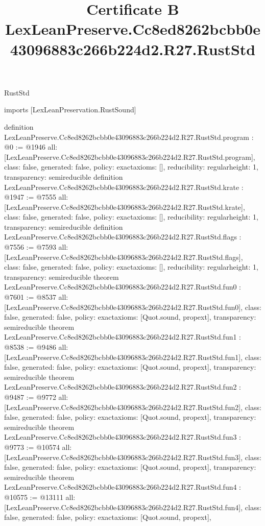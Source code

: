 \begin{lexlean}{RustStd}
\title{Certificate B LexLeanPreserve.Cc8ed8262bcbb0e43096883c266b224d2.R27.RustStd}
\begin{coremodule}
imports [LexLeanPreservation.RustSound]

definition LexLeanPreserve.Cc8ed8262bcbb0e43096883c266b224d2.R27.RustStd.program : @0 := @1946 {
  all: [LexLeanPreserve.Cc8ed8262bcbb0e43096883c266b224d2.R27.RustStd.program],
  class: false,
  generated: false,
  policy: exact{axioms: []},
  reducibility: regular{height: 1},
  transparency: semireducible
}
definition LexLeanPreserve.Cc8ed8262bcbb0e43096883c266b224d2.R27.RustStd.krate : @1947 := @7555 {
  all: [LexLeanPreserve.Cc8ed8262bcbb0e43096883c266b224d2.R27.RustStd.krate],
  class: false,
  generated: false,
  policy: exact{axioms: []},
  reducibility: regular{height: 1},
  transparency: semireducible
}
definition LexLeanPreserve.Cc8ed8262bcbb0e43096883c266b224d2.R27.RustStd.flags : @7556 := @7593 {
  all: [LexLeanPreserve.Cc8ed8262bcbb0e43096883c266b224d2.R27.RustStd.flags],
  class: false,
  generated: false,
  policy: exact{axioms: []},
  reducibility: regular{height: 1},
  transparency: semireducible
}
theorem LexLeanPreserve.Cc8ed8262bcbb0e43096883c266b224d2.R27.RustStd.fun0 : @7601 := @8537 {
  all: [LexLeanPreserve.Cc8ed8262bcbb0e43096883c266b224d2.R27.RustStd.fun0],
  class: false,
  generated: false,
  policy: exact{axioms: [Quot.sound, propext]},
  transparency: semireducible
}
theorem LexLeanPreserve.Cc8ed8262bcbb0e43096883c266b224d2.R27.RustStd.fun1 : @8538 := @9486 {
  all: [LexLeanPreserve.Cc8ed8262bcbb0e43096883c266b224d2.R27.RustStd.fun1],
  class: false,
  generated: false,
  policy: exact{axioms: [Quot.sound, propext]},
  transparency: semireducible
}
theorem LexLeanPreserve.Cc8ed8262bcbb0e43096883c266b224d2.R27.RustStd.fun2 : @9487 := @9772 {
  all: [LexLeanPreserve.Cc8ed8262bcbb0e43096883c266b224d2.R27.RustStd.fun2],
  class: false,
  generated: false,
  policy: exact{axioms: [Quot.sound, propext]},
  transparency: semireducible
}
theorem LexLeanPreserve.Cc8ed8262bcbb0e43096883c266b224d2.R27.RustStd.fun3 : @9773 := @10574 {
  all: [LexLeanPreserve.Cc8ed8262bcbb0e43096883c266b224d2.R27.RustStd.fun3],
  class: false,
  generated: false,
  policy: exact{axioms: [Quot.sound, propext]},
  transparency: semireducible
}
theorem LexLeanPreserve.Cc8ed8262bcbb0e43096883c266b224d2.R27.RustStd.fun4 : @10575 := @13111 {
  all: [LexLeanPreserve.Cc8ed8262bcbb0e43096883c266b224d2.R27.RustStd.fun4],
  class: false,
  generated: false,
  policy: exact{axioms: [Quot.sound, propext]},
}
\end{coremodule}
\end{lexlean}
